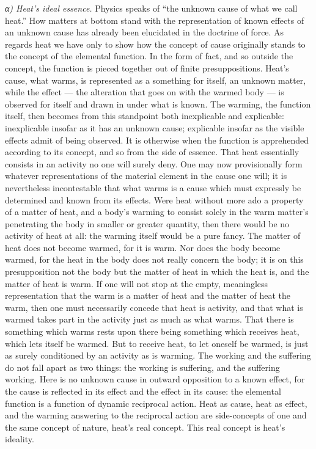 \documentclass[12pt,a4paper]{book}
\newcommand{\subrunin}[1]{\emph{#1}\hspace{0.4em}}
\begin{document}
\subrunin{α) Heat's ideal essence.} Physics speaks of ``the unknown cause of what we call heat.'' How matters at bottom
stand with the representation of known effects of an unknown cause has already been elucidated in the doctrine of force.
As regards heat we have only to show how the concept of cause originally stands to the concept of the elemental
function. In the form of fact, and so outside the concept, the function is pieced together out of finite presuppositions.
Heat's cause, what warms, is represented as a something for itself, an unknown matter, while the effect --- the
alteration that goes on with the warmed body --- is observed for itself and drawn in under what is known. The warming,
the function itself, then becomes from this standpoint both inexplicable and explicable: inexplicable insofar as it has
an unknown cause; explicable insofar as the visible effects admit of being observed. It is otherwise when the function is
apprehended according to its concept, and so from the side of essence. That heat essentially consists in an activity no
one will surely deny. One may now provisionally form whatever representations of the material element in the cause one
will; it is nevertheless incontestable that what warms is a cause which must expressly be determined and known from its
effects. Were heat without more ado a property of a matter of heat, and a body's warming to consist solely in the warm
matter's penetrating the body in smaller or greater quantity, then there would be no activity of heat at all: the warming
itself would be a pure fancy. The matter of heat does not become warmed, for it is warm. Nor does the body become warmed,
for the heat in the body does not really concern the body; it is on this presupposition not the body but the matter of
heat in which the heat is, and the matter of heat is warm. If one will not stop at the empty, meaningless representation
that the warm is a matter of heat and the matter of heat the warm, then one must necessarily concede that heat is
activity, and that what is warmed takes part in the activity just as much as what warms. That there is something which
warms rests upon there being something which receives heat, which lets itself be warmed. But to receive heat, to let
oneself be warmed, is just as surely conditioned by an activity as is warming. The working and the suffering do not fall
apart as two things: the working is suffering, and the suffering working. Here is no unknown cause in outward opposition
to a known effect, for the cause is reflected in its effect and the effect in its cause: the elemental function is a
function of dynamic reciprocal action. Heat as cause, heat as effect, and the warming answering to the reciprocal action
are side-concepts of one and the same concept of nature, heat's real concept. This real concept is heat's ideality.
\end{document}
